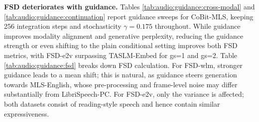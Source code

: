 \begin{table}[t]
\centering
\small
\setlength{\tabcolsep}{4.5pt}
\caption{CoBit-MLS scores with a deterministic sampler across all four tasks. Integration steps are fixed to 256 and the conditional task use classifier-free guidance with strength 5.}
\label{tab:audio:deterministic}
\end{table}
 
\textbf{FSD deteriorates with guidance.} Tables \ref{tab:audio:guidance:cross-modal} and \ref{tab:audio:guidance:continuation} report guidance sweeps for CoBit-MLS, keeping 256 integration steps and stochasticity $\gamma=0.175$ throughout. While guidance improves modality alignment and generative perplexity, reducing the guidance strength or even shifting to the plain conditional setting improves both FSD metrics, with FSD-e2v surpassing TASLM-Embed for gs=1 and gs=2. Table \ref{tab:audio:guidance:fsd} breaks down FSD calculation. For FSD-wlm, stronger guidance leads to a mean shift; this is natural, as guidance steers generation towards MLS-English, whose pre-processing and frame-level noise may differ substantially from LibriSpeech-PC. For FSD-e2v, only the variance is affected; both datasets consist of reading-style speech and hence contain similar expressiveness.

